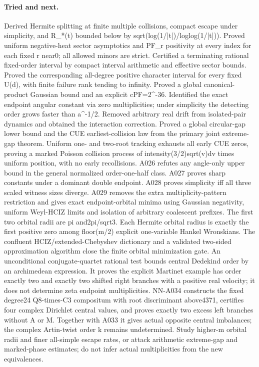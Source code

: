 \paragraph{Tried and next.} Derived Hermite splitting at finite multiple collisions, compact escape under simplicity, and R\_*(t) bounded below by sqrt(log(1/|t|)/loglog(1/|t|)). Proved uniform negative-heat sector asymptotics and PF\_r positivity at every index for each fixed r near0; all allowed minors are strict. Certified a terminating rational fixed-order interval by compact interval arithmetic and effective sector bounds. Proved the corresponding all-degree positive character interval for every fixed U(d), with finite failure rank tending to infinity. Proved a global canonical-product Gaussian bound and an explicit cPF=2\textasciicircum{}-36. Identified the exact endpoint angular constant via zero multiplicities; under simplicity the detecting order grows faster than a\textasciicircum{}-1/2. Removed arbitrary real drift from isolated-pair dynamics and obtained the interaction correction. Proved a global circular-gap lower bound and the CUE earliest-collision law from the primary joint extreme-gap theorem. Uniform one- and two-root tracking exhausts all early CUE zeros, proving a marked Poisson collision process of intensity(3/2)sqrt(v)dv times uniform position, with no early recollisions. A026 refutes any angle-only upper bound in the general normalized order-one-half class. A027 proves sharp constants under a dominant double endpoint. A028 proves simplicity iff all three scaled witness sizes diverge. A029 removes the extra multiplicity-pattern restriction and gives exact endpoint-orbital minima using Gaussian negativity, uniform Weyl-HCIZ limits and isolation of arbitrary coalescent prefixes. The first two orbital radii are pi and2pi/sqrt3. Each Hermite orbital radius is exactly the first positive zero among floor(m/2) explicit one-variable Hankel Wronskians. The confluent HCIZ/extended-Chebyshev dictionary and a validated two-sided approximation algorithm close the finite orbital minimization gate. An unconditional conjugate-quartet rational test bounds central Dedekind order by an archimedean expression. It proves the explicit Martinet example has order exactly two and exactly two shifted right branches with a positive real velocity; it does not determine zeta endpoint multiplicities. NN-A034 constructs the fixed degree24 Q8-times-C3 compositum with root discriminant above4371, certifies four complex Dirichlet central values, and proves exactly two excess left branches without A or M. Together with A033 it gives actual opposite central imbalances; the complex Artin-twist order k remains undetermined. Study higher-m orbital radii and finer all-simple escape rates, or attack arithmetic extreme-gap and marked-phase estimates; do not infer actual multiplicities from the new equivalences.


